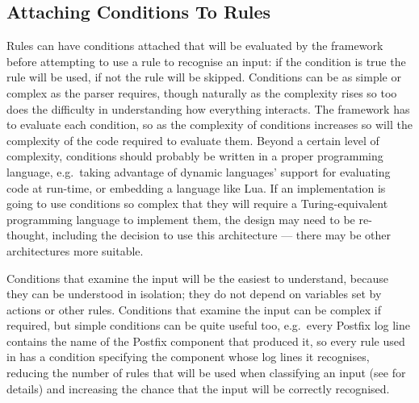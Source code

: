 \newpage{} %
\subsection{Attaching Conditions To Rules}

\label{attaching conditions to rules}

Rules can have conditions attached that will be evaluated by the framework
before attempting to use a rule to recognise an input: if the condition is
true the rule will be used, if not the rule will be skipped.  Conditions
can be as simple or complex as the parser requires, though naturally as the
complexity rises so too does the difficulty in understanding how everything
interacts.  The framework has to evaluate each condition, so as the
complexity of conditions increases so will the complexity of the code
required to evaluate them.  Beyond a certain level of complexity,
conditions should probably be written in a proper programming language,
e.g.\ taking advantage of dynamic languages' support for evaluating code at
run-time, or embedding a language like Lua.  If an implementation is going
to use conditions so complex that they will require a Turing-equivalent
programming language to implement them, the design may need to be
re-thought, including the decision to use this architecture --- there may
be other architectures more suitable.

Conditions that examine the input will be the easiest to understand,
because they can be understood in isolation; they do not depend on
variables set by actions or other rules.  Conditions that examine the input
can be complex if required, but simple conditions can be quite useful too,
e.g.\ every Postfix log line contains the name of the Postfix component
that produced it, so every rule used in \parsername{} has a condition
specifying the component whose log lines it recognises, reducing the number
of rules that will be used when classifying an input (see  for details) and increasing the chance that the input
will be correctly recognised.

